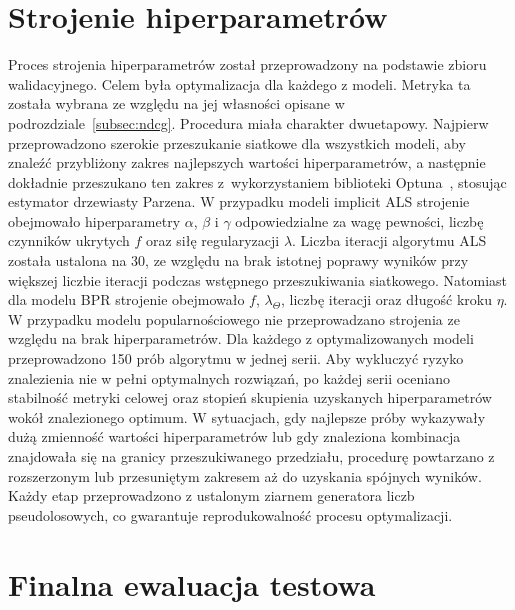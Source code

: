 \section{Strojenie hiperparametrów}

Proces strojenia hiperparametrów został przeprowadzony na podstawie zbioru walidacyjnego. Celem była optymalizacja \ndcg{} dla każdego z modeli. Metryka ta została wybrana ze względu na jej własności opisane w podrozdziale~\ref{subsec:ndcg}. Procedura miała charakter dwuetapowy. Najpierw przeprowadzono szerokie przeszukanie siatkowe dla wszystkich modeli, aby znaleźć przybliżony zakres najlepszych wartości hiperparametrów, a następnie dokładnie przeszukano ten zakres z~wykorzystaniem biblioteki Optuna~\cite{akiba2019optuna}, stosując estymator drzewiasty Parzena. W przypadku modeli implicit ALS strojenie obejmowało hiperparametry $\alpha$, $\beta$ i $\gamma$ odpowiedzialne za wagę pewności, liczbę czynników ukrytych $f$ oraz siłę regularyzacji $\lambda$. Liczba iteracji algorytmu ALS została ustalona na 30, ze względu na brak istotnej poprawy wyników przy większej liczbie iteracji podczas wstępnego przeszukiwania siatkowego. Natomiast dla modelu BPR strojenie obejmowało $f$, $\lambda_\Theta$, liczbę iteracji oraz długość kroku $\eta$. W przypadku modelu popularnościowego nie przeprowadzano strojenia ze względu na brak hiperparametrów. Dla każdego z optymalizowanych modeli przeprowadzono 150 prób algorytmu w jednej serii. Aby wykluczyć ryzyko znalezienia nie w pełni optymalnych rozwiązań, po każdej serii oceniano stabilność metryki celowej oraz stopień skupienia uzyskanych hiperparametrów wokół znalezionego optimum. W sytuacjach, gdy najlepsze próby wykazywały dużą zmienność wartości hiperparametrów lub gdy znaleziona kombinacja znajdowała się na granicy przeszukiwanego przedziału, procedurę powtarzano z rozszerzonym lub przesuniętym zakresem aż do uzyskania spójnych wyników. Każdy etap przeprowadzono z ustalonym ziarnem generatora liczb pseudolosowych, co gwarantuje reprodukowalność procesu optymalizacji.


\section{Finalna ewaluacja testowa}

